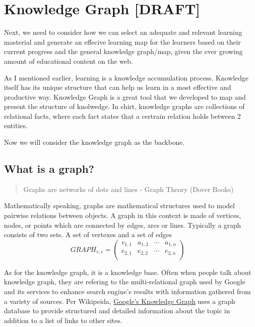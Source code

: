 \documentclass[]{book}
\theoremstyle{definition}
\theoremstyle{definition}
\theoremstyle{definition}
\theoremstyle{remark}
\begin{document}
\section{Knowledge Graph {[}DRAFT{]}}\label{knowledge-graph-draft}

Next, we need to consider how we can select an adequate and relevant
learning masterial and generate an effecive learning map for the
learners based on their current progress and the general knowledge
graph/map, given the ever growing amount of educational content on the
web.

As I mentioned earlier, learning is a knowledge accumulation process.
Knowledge itself has its unique structure that can help us learn in a
most effective and productive way. Knowledge Graph is a great tool that
we developed to map and present the structure of knolwedge. In shirt,
knowledge graphs are collections of relational facts, where each fact
states that a certrain relation holds between 2 entities.

Now we will consider the knowledge graph as the backbone.

\subsection{What is a graph?}\label{what-is-a-graph}

\begin{quote}
Graphs are networks of dots and lines - Graph Theory (Dover Books)
\end{quote}

Mathematically speaking, graphs are mathematical structures used to
model pairwise relations between objects. A graph in this context is
made of vertices, nodes, or points which are connected by edges, arcs or
lines. Typically a graph consists of two sets. A set of vertexes and a
set of edges \[GRAPH_{v,e} =
 \begin{pmatrix}
  v_{1,1} & a_{1,2} & \cdots & a_{1,n} \\
  e_{2,1} & e_{2,2} & \cdots & e_{2,n} \\
 \end{pmatrix}\]

As for the knowledge graph, it is a knowledge base. Often when people
talk about knowledge graph, they are refering to the multi-relational
graph used by Google and its services to enhance search engine's results
with information gathered from a variety of sources. Per Wikipeida,
\href{https://developers.google.com/knowledge-graph/\#knowledge_graph_entities}{Google's
Knowledge Graph} uses a graph database to provide structured and
detailed information about the topic in addition to a list of links to
other sites.
\end{document}
